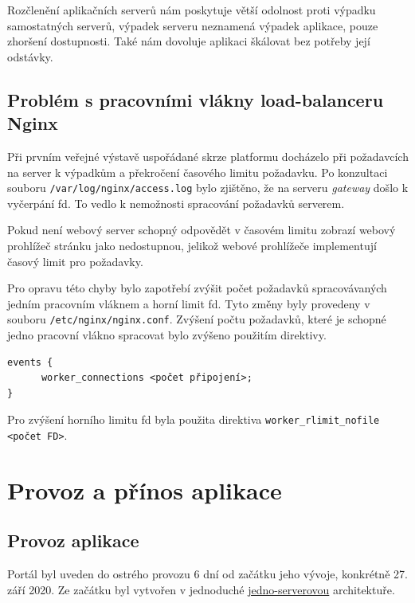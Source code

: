Rozčlenění aplikačních serverů nám poskytuje větší odolnost proti výpadku samostatných serverů, výpadek serveru neznamená výpadek aplikace, pouze zhoršení dostupnosti.
Také nám dovoluje aplikaci škálovat bez potřeby její odstávky.

\subsection{Problém s pracovními vlákny load-balanceru Nginx}\label{sub:poor-nginx}

Při prvním veřejné výstavě uspořádané skrze platformu \bso{} docházelo při požadavcích na server k výpadkům a překročení časového limitu požadavku.
Po konzultaci souboru \verb|/var/log/nginx/access.log| bylo zjištěno, že na serveru \textit{gateway} došlo k vyčerpání \acrshort{fd}.
To vedlo k nemožnosti spracování požadavků serverem.

Pokud není webový server schopný odpovědět v časovém limitu zobrazí webový prohlížeč stránku jako nedostupnou,
jelikož webové prohlížeče implementují časový limit pro požadavky\cite{browser-timeout}.

Pro opravu této chyby bylo zapotřebí zvýšit počet požadavků spracovávaných jedním pracovním vláknem a horní limit \acrshort{fd}.
Tyto změny byly provedeny v souboru \verb|/etc/nginx/nginx.conf|.
Zvýšení počtu požadavků, které je schopné jedno pracovní vlákno spracovat bylo zvýšeno použitím direktivy.
\begin{verbatim}
events {
      worker_connections <počet připojení>;
}
\end{verbatim}
Pro zvýšení horního limitu \acrshort{fd} byla použita direktiva \verb|worker_rlimit_nofile <počet FD>|.

\section{Provoz a přínos aplikace}

\subsection{Provoz aplikace}

Portál byl uveden do ostrého provozu 6 dní od začátku jeho vývoje, konkrétně 27. září 2020. Ze začátku byl vytvořen v jednoduché \hyperref[sub:one-server]{jedno-serverovou} architektuře.

